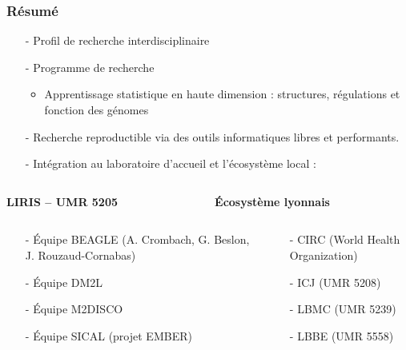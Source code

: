\documentclass[11pt,xcolor=dvipsnames]{beamer}
\begin{document}
\begin{frame}
\frametitle{Résumé}
\begin{itemize}
\small
\item[-] Profil de recherche interdisciplinaire
\item[-] Programme de recherche \\
\begin{itemize}
\item Apprentissage statistique en haute dimension : structures,
régulations et fonction des génomes
\end{itemize}
\item[-] Recherche reproductible via des outils informatiques libres et
performants.
\item[-] Intégration au laboratoire d'accueil et l'écosystème local :
\end{itemize}

\begin{columns}
\begin{column}{0.49\linewidth}
\centering
\tiny
{\bf LIRIS -- UMR 5205}
\end{column}
\begin{column}{0.49\linewidth}
\tiny
\centering
{\bf Écosystème lyonnais}
\end{column}

\end{columns}
\begin{columns}
\tiny
\begin{column}{0.49\linewidth}
\begin{itemize}
\item[-] {\color{red} Équipe BEAGLE} (A. Crombach, G. Beslon, J. Rouzaud-Cornabas)
\item[-] Équipe DM2L 
\item[-] Équipe M2DISCO
\item[-] Équipe SICAL (projet EMBER)
\end{itemize}
\end{column}

\begin{column}{0.49\linewidth}
\begin{itemize}
\item[-] CIRC (World Health Organization)
\item[-] ICJ (UMR 5208)
\item[-] LBMC (UMR 5239)
\item[-] LBBE (UMR 5558)
\end{itemize}
\end{column}
\end{columns}


\end{frame}
\end{document}
